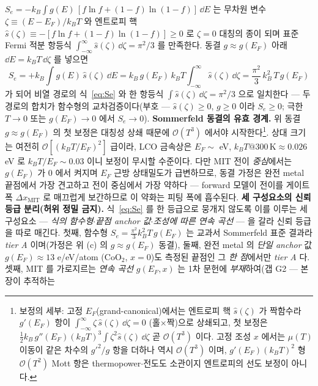 $S_e=-k_B\int g(E)\,[f\ln f+(1-f)\ln(1-f)]\,\dd E$ 는 무차원 변수 $\zeta\equiv(E-E_F)/k_BT$ 와 엔트로피 핵
$\hat s(\zeta)\equiv-[f\ln f+(1-f)\ln(1-f)]\ge0$ 로 $\zeta=0$ 대칭의 종이 되며 표준 Fermi 적분 항등식
$\int_{-\infty}^{\infty}\hat s(\zeta)\,\dd\zeta=\pi^2/3$ 를 만족한다. 동결 $g\approx g(E_F)$ 아래 $\dd E=k_BT\,\dd\zeta$
를 넣으면
\begin{equation}
S_e=+k_B\int g(E)\,\hat s(\zeta)\,\dd E
=k_B\,g(E_F)\,k_BT\!\int_{-\infty}^{\infty}\!\hat s(\zeta)\,\dd\zeta
=\frac{\pi^2}{3}\,k_B^2\,T\,g(E_F)
\label{eq:Sedirect}
\end{equation}
가 되어 비열 경로의 식~\eqref{eq:Se} 와 한 항등식 $\int \hat s(\zeta)\,\dd\zeta=\pi^2/3$ 으로 일치한다 --- 두 경로의
합치가 함수형의 교차검증이다(부호 --- $\hat s(\zeta)\ge0$, $g\ge0$ 이라 $S_e\ge0$; 극한 $T\to0$ 또는 $g(E_F)\to0$ 에서
$S_e\to0$).
\textbf{Sommerfeld 동결의 유효 경계.} 위 동결 $g\approx g(E_F)$ 의 첫 보정은 대칭성 상쇄 때문에
$\mathcal O(T^3)$ 에서야 시작한다\footnote{보정의 세부: 고정 $E_F$(grand-canonical)에서는 엔트로피 핵
$\hat s(\zeta)$ 가 짝함수라 $g'(E_F)$ 항이 $\int_{-\infty}^{\infty}\!\zeta\,\hat s(\zeta)\,\dd\zeta=0$
(홀$\times$짝)으로 상쇄되고, 첫 보정은 $\tfrac12 k_B\,g''(E_F)(k_BT)^3\!\int\zeta^2 \hat s(\zeta)\,\dd\zeta$
곧 $\mathcal O(T^3)$ 이다. 고정 조성 $x$ 에서는 $\mu(T)$ 이동이 같은 차수의 $g'^2/g$ 항을 더하나 역시
$\mathcal O(T^3)$ 이며, $g'(E_F)(k_BT)^2$ 형 $\mathcal O(T^2)$ Mott 항은 thermopower$\cdot$전도도
소관이지 엔트로피의 선도 보정이 아니다.}. 상대 크기는 여전히 $\mathcal O[(k_BT/E_F)^2]$ 급이라,
LCO 금속상은 $E_F\sim$ eV, $k_BT@300\,\mathrm K\approx0.026$ eV 로 $k_BT/E_F\sim0.03$ 이니 보정이 무시할 수준이다. 다만 MIT 전이 \emph{중심}에서는 $g(E_F)$
가 0 에서 켜지며 $E_F$ 근방 상태밀도가 급변하므로, 동결 가정은 완전 metal 끝점에서 가장 견고하고 전이 중심에서
가장 약하다 --- forward 모델이 전이를 게이트 폭 $\Delta x_\mathrm{MIT}$ 로 매끄럽게 보간하므로 이 약화는 피팅 폭에
흡수된다. \textbf{세 구성요소의 신뢰 등급 분리(허위 정밀 금지).}
식~\eqref{eq:Se} 를 한 등급으로 뭉개지 않도록 이를 이루는 세 구성요소 --- \emph{식의 함수형}$\cdot$\emph{끝점
anchor 값}$\cdot$\emph{조성에 따른 연속 곡선} --- 을 갈라 신뢰 등급을 따로 매긴다. 첫째, 함수형
$S_e=\tfrac{\pi^2}{3}k_B^2T\,g(E_F)$ 는 교과서 Sommerfeld 표준 결과라 \emph{tier A} 이며(가정은 위 (c) 의
$g\!\approx\!g(E_F)$ 동결), 둘째, 완전 metal 의 \emph{단일 anchor} 값 $g(E_F)\!\approx\!13$ e/eV/atom
($\mathrm{CoO_2}$, $x{=}0$)도 측정된 끝점인 그 \emph{한 점}에서만 \emph{tier A} 다\cite{motohashi2009}. 셋째,
MIT 를 가로지르는 \emph{연속 곡선} $g(E_F,x)$ 는 1차 문헌에 \emph{부재}하여(갭 G2 --- 본 장이 추적하는
